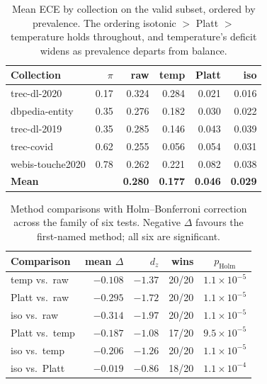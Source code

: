 \documentclass[sigconf,nonacm]{acmart}
\newcommand{\thead}[1]{\textbf{#1}}
\begin{document}
\begin{table}[t]
\centering
\caption{Mean ECE by collection on the valid subset, ordered by prevalence. The
ordering isotonic $>$ Platt $>$ temperature holds throughout, and temperature's
deficit widens as prevalence departs from balance.}\label{tab:valid}
\small
\begin{tabular}{lrrrrr}
\toprule
\thead{Collection} & \thead{$\pi$} & \thead{raw} & \thead{temp} & \thead{Platt} & \thead{iso} \\
\midrule
trec-dl-2020     & 0.17 & 0.324 & 0.284 & 0.021 & 0.016 \\
dbpedia-entity   & 0.35 & 0.276 & 0.182 & 0.030 & 0.022 \\
trec-dl-2019     & 0.35 & 0.285 & 0.146 & 0.043 & 0.039 \\
trec-covid       & 0.62 & 0.255 & 0.056 & 0.054 & 0.031 \\
webis-touche2020 & 0.78 & 0.262 & 0.221 & 0.082 & 0.038 \\
\midrule
\rowcolor{bestcell}
\textbf{Mean}    &      & \textbf{0.280} & \textbf{0.177} & \textbf{0.046} & \textbf{0.029} \\
\bottomrule
\end{tabular}
\end{table}

\begin{table}[t]
\centering
\caption{Method comparisons with Holm--Bonferroni correction across the family of six
tests. Negative $\Delta$ favours the first-named method; all six are significant.}
\label{tab:stats}
\small
\begin{tabular}{lrrrc}
\toprule
\thead{Comparison} & \thead{mean $\Delta$} & \thead{$d_z$} & \thead{wins} & \thead{$p_{\text{Holm}}$} \\
\midrule
temp vs.\ raw       & $-0.108$ & $-1.37$ & 20/20 & $1.1{\times}10^{-5}$ \\
Platt vs.\ raw      & $-0.295$ & $-1.72$ & 20/20 & $1.1{\times}10^{-5}$ \\
iso vs.\ raw        & $-0.314$ & $-1.97$ & 20/20 & $1.1{\times}10^{-5}$ \\
Platt vs.\ temp     & $-0.187$ & $-1.08$ & 17/20 & $9.5{\times}10^{-5}$ \\
iso vs.\ temp       & $-0.206$ & $-1.26$ & 20/20 & $1.1{\times}10^{-5}$ \\
iso vs.\ Platt      & $-0.019$ & $-0.86$ & 18/20 & $1.1{\times}10^{-4}$ \\
\bottomrule
\end{tabular}
\end{table}
\end{document}
